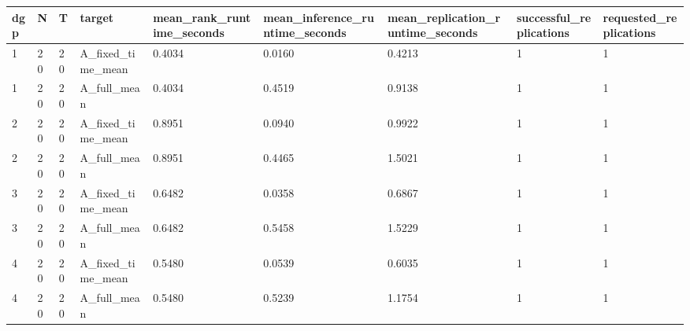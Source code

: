 \begin{tabular}{lllllllll}
\toprule
dgp & N & T & target & mean\_rank\_runtime\_seconds & mean\_inference\_runtime\_seconds & mean\_replication\_runtime\_seconds & successful\_replications & requested\_replications \\
\midrule
1 & 20 & 20 & A\_fixed\_time\_mean & 0.4034 & 0.0160 & 0.4213 & 1 & 1 \\
1 & 20 & 20 & A\_full\_mean & 0.4034 & 0.4519 & 0.9138 & 1 & 1 \\
2 & 20 & 20 & A\_fixed\_time\_mean & 0.8951 & 0.0940 & 0.9922 & 1 & 1 \\
2 & 20 & 20 & A\_full\_mean & 0.8951 & 0.4465 & 1.5021 & 1 & 1 \\
3 & 20 & 20 & A\_fixed\_time\_mean & 0.6482 & 0.0358 & 0.6867 & 1 & 1 \\
3 & 20 & 20 & A\_full\_mean & 0.6482 & 0.5458 & 1.5229 & 1 & 1 \\
4 & 20 & 20 & A\_fixed\_time\_mean & 0.5480 & 0.0539 & 0.6035 & 1 & 1 \\
4 & 20 & 20 & A\_full\_mean & 0.5480 & 0.5239 & 1.1754 & 1 & 1 \\
\bottomrule
\end{tabular}
